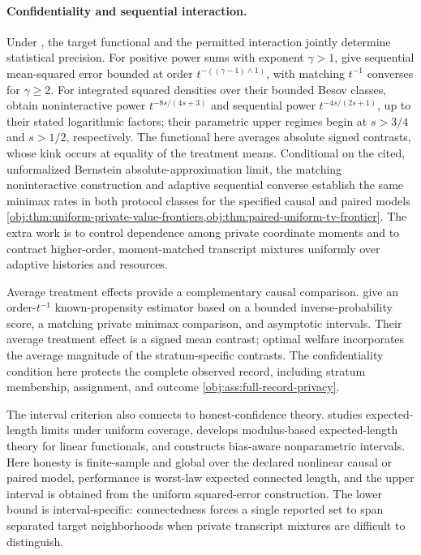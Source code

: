 \paragraph{Confidentiality and sequential interaction.}
Under , the target functional and the permitted interaction jointly determine statistical precision. For positive power sums with exponent \(\gamma>1\), \citet[Theorems~2.4--2.7]{ButuceaIssartel2021Functionals} give sequential mean-squared error bounded at order \(t^{-((\gamma-1)\wedge1)}\), with matching \(t^{-1}\) converses for \(\gamma\ge2\). For integrated squared densities over their bounded Besov classes, \citet[Theorems~3.2--3.3 and~4.1--4.2]{ButuceaRohdeSteinberger2023Quadratic} obtain noninteractive power \(t^{-8s/(4s+3)}\) and sequential power \(t^{-4s/(2s+1)}\), up to their stated logarithmic factors; their parametric upper regimes begin at \(s>3/4\) and \(s>1/2\), respectively. The functional here averages absolute signed contrasts, whose kink occurs at equality of the treatment means. Conditional on the cited, unformalized Bernstein absolute-approximation limit, the matching noninteractive construction and adaptive sequential converse establish the same minimax rates in both protocol classes for the specified causal and paired models \cref{obj:thm:uniform-private-value-frontiers,obj:thm:paired-uniform-tv-frontier}. The extra work is to control dependence among private coordinate moments and to contract higher-order, moment-matched transcript mixtures uniformly over adaptive histories and resources.

Average treatment effects provide a complementary causal comparison. \citet[Lemma~4 and Theorem~7]{OhnishiAwan2025Randomized} give an order-\(t^{-1}\) known-propensity estimator based on a bounded inverse-probability score, a matching private minimax comparison, and asymptotic intervals. Their average treatment effect is a signed mean contrast; optimal welfare incorporates the average magnitude of the stratum-specific contrasts. The confidentiality condition here protects the complete observed record, including stratum membership, assignment, and outcome \cref{obj:ass:full-record-privacy}.

The interval criterion also connects to honest-confidence theory. \citet{Low1997} studies expected-length limits under uniform coverage, \citet{CaiLow2004AdaptationCI} develops modulus-based expected-length theory for linear functionals, and \citet{ArmstrongKolesar2020HonestCI} constructs bias-aware nonparametric intervals. Here honesty is finite-sample and global over the declared nonlinear causal or paired model, performance is worst-law expected connected length, and the upper interval is obtained from the uniform squared-error construction. The lower bound is interval-specific: connectedness forces a single reported set to span separated target neighborhoods when private transcript mixtures are difficult to distinguish.

